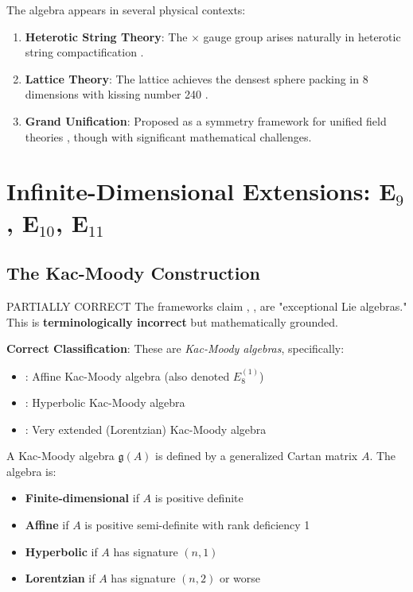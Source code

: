 The  algebra appears in several physical contexts:

\begin{enumerate}
    \item \textbf{Heterotic String Theory}: The  $\times$  gauge group arises naturally in heterotic string compactification \cite{green2012superstring}.

    \item \textbf{Lattice Theory}: The  lattice achieves the densest sphere packing in 8 dimensions with kissing number 240 \cite{cohn2017sphere}.

    \item \textbf{Grand Unification}: Proposed as a symmetry framework for unified field theories \cite{lisi2007e8}, though with significant mathematical challenges.
\end{enumerate}

\section{Infinite-Dimensional Extensions: E$_9$, E$_{10}$, E$_{11}$}

\subsection{The Kac-Moody Construction}

\begin{factcheck}{PARTIALLY CORRECT}
The frameworks claim , ,  are "exceptional Lie algebras." This is \textbf{terminologically incorrect} but mathematically grounded.

\textbf{Correct Classification}: These are \textit{Kac-Moody algebras}, specifically:
\begin{itemize}
    \item {}: Affine Kac-Moody algebra (also denoted $E_8^{(1)}$)
    \item {}: Hyperbolic Kac-Moody algebra
    \item {}: Very extended (Lorentzian) Kac-Moody algebra
\end{itemize}
\end{factcheck}

\begin{definition}
A Kac-Moody algebra $\mathfrak{g}(A)$ is defined by a generalized Cartan matrix $A$. The algebra is:
\begin{itemize}
    \item \textbf{Finite-dimensional} if $A$ is positive definite
    \item \textbf{Affine} if $A$ is positive semi-definite with rank deficiency 1
    \item \textbf{Hyperbolic} if $A$ has signature $(n, 1)$
    \item \textbf{Lorentzian} if $A$ has signature $(n, 2)$ or worse
\end{itemize}
\end{definition}

